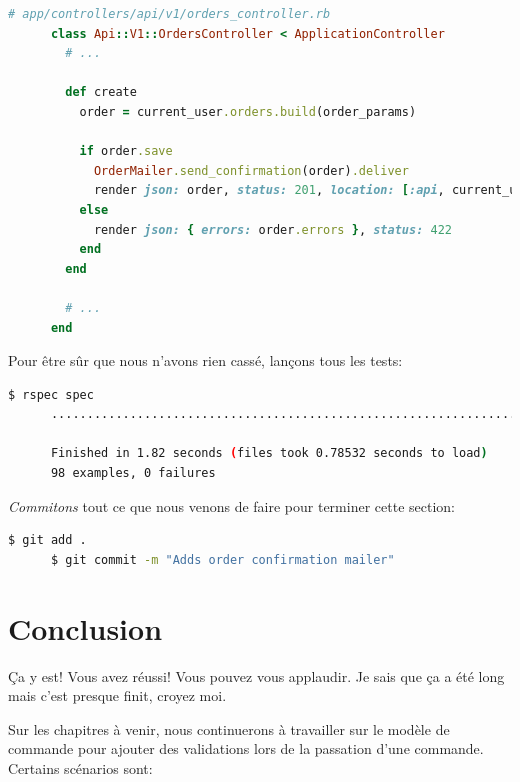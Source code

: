 \documentclass[]{report}
\begin{document}
    \begin{scriptsize}
      \begin{lstlisting}[language=ruby]
      # app/controllers/api/v1/orders_controller.rb
      class Api::V1::OrdersController < ApplicationController
        # ...

        def create
          order = current_user.orders.build(order_params)

          if order.save
            OrderMailer.send_confirmation(order).deliver
            render json: order, status: 201, location: [:api, current_user, order]
          else
            render json: { errors: order.errors }, status: 422
          end
        end

        # ...
      end
      \end{lstlisting}
    \end{scriptsize}

    Pour être sûr que nous n'avons rien cassé, lançons tous les tests:

    \begin{scriptsize}
      \begin{lstlisting}[language=bash]
      $ rspec spec
      ..................................................................................................

      Finished in 1.82 seconds (files took 0.78532 seconds to load)
      98 examples, 0 failures
      \end{lstlisting}
    \end{scriptsize}

    \textit{Commitons} tout ce que nous venons de faire pour terminer cette section:

    \begin{scriptsize}
      \begin{lstlisting}[language=bash]
      $ git add .
      $ git commit -m "Adds order confirmation mailer"
      \end{lstlisting}
    \end{scriptsize}

  \section{Conclusion}

   Ça y est! Vous avez réussi! Vous pouvez vous applaudir. Je sais que ça a été long mais c'est presque finit, croyez moi.

   Sur les chapitres à venir, nous continuerons à travailler sur le modèle de commande pour ajouter des validations lors de la passation d'une commande. Certains scénarios sont:
\end{document}
